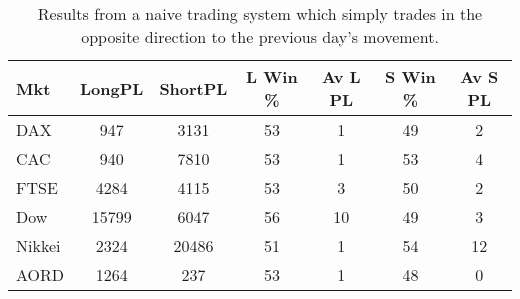 \begin{table}[ht]
\centering
\caption[Results from the Naive Reversing System.]{Results from a naive trading system which simply trades in the opposite direction to the previous day's movement.} 
\label{tab:n_rev_results_chp6}
\begin{tabular}{lcccccc}
  \toprule Mkt & LongPL & ShortPL & L Win \% & Av L PL & S Win \% & Av S PL \\ 
  \midrule DAX & 947 & 3131 & 53 & 1 & 49 & 2 \\ 
  CAC & 940 & 7810 & 53 & 1 & 53 & 4 \\ 
  FTSE & 4284 & 4115 & 53 & 3 & 50 & 2 \\ 
  Dow & 15799 & 6047 & 56 & 10 & 49 & 3 \\ 
  Nikkei & 2324 & 20486 & 51 & 1 & 54 & 12 \\ 
  AORD & 1264 & 237 & 53 & 1 & 48 & 0 \\ 
   \bottomrule \end{tabular}
\end{table}

